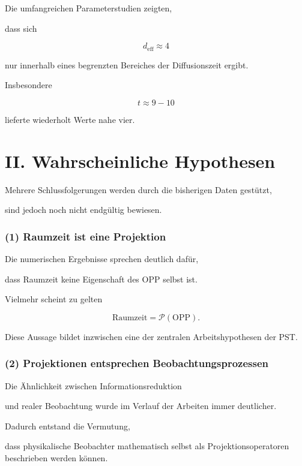 Die umfangreichen Parameterstudien zeigten,

dass sich

\[
d_{\mathrm{eff}}
\approx
4
\]

nur innerhalb eines begrenzten Bereiches der Diffusionszeit ergibt.

Insbesondere

\[
t
\approx
9
-
10
\]

lieferte wiederholt Werte nahe vier.


\section*{II. Wahrscheinliche Hypothesen}

Mehrere Schlussfolgerungen werden durch die bisherigen Daten gestützt,

sind jedoch noch nicht endgültig bewiesen.


\subsubsection*{(1) Raumzeit ist eine Projektion}

Die numerischen Ergebnisse sprechen deutlich dafür,

dass Raumzeit keine Eigenschaft des OPP selbst ist.

Vielmehr scheint zu gelten

\[
\boxed{
\text{Raumzeit}
=
\mathcal{P}(\mathrm{OPP}).
}
\]

Diese Aussage bildet inzwischen eine der zentralen Arbeitshypothesen der PST.


\subsubsection*{(2) Projektionen entsprechen Beobachtungsprozessen}

Die Ähnlichkeit zwischen Informationsreduktion

und realer Beobachtung wurde im Verlauf der Arbeiten immer deutlicher.

Dadurch entstand die Vermutung,

dass physikalische Beobachter mathematisch selbst als Projektionsoperatoren beschrieben werden können.

